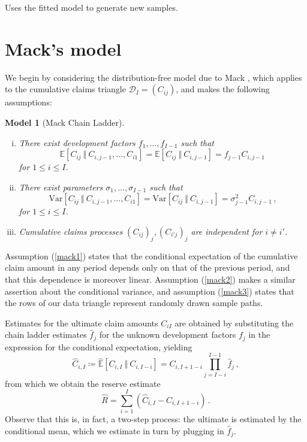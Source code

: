 \documentclass[a4paper]{book}
\theoremstyle{plain}
\newtheorem{model}{Model}
\begin{document}
Uses the fitted model to generate new samples.

\section{Mack's model}

We begin by considering the distribution-free model due to Mack , which applies to the cumulative claims triangle $\mathcal{D}_I = (C_{ij})$, and makes the following assumptions:

\begin{model}[Mack Chain Ladder] \label{mack} \leavevmode
    \begin{enumerate}[(i)]
        \item \label{mack1} There exist development factors $f_1, \dots, f_{I - 1}$ such that
        \begin{displaymath}
            \mathbb{E}[C_{ij} \ \Vert \ C_{i, j - 1}, \dots, C_{i1}] = \mathbb{E}[C_{ij} \ \Vert \ C_{i, j - 1}] = f_{j - 1} C_{i, j - 1}\,
        \end{displaymath}
        for $1 \leq i \leq I$.
        \item \label{mack2} There exist parameters $\sigma_1, \dots, \sigma_{I - 1}$ such that
        \begin{displaymath}
            \mathrm{Var}[C_{ij} \ \Vert \ C_{i, j - 1}, \dots, C_{i1}] = \mathrm{Var}[C_{ij} \ \Vert \ C_{i, j - 1}] = \sigma_{j - 1}^2 C_{i, j - 1}\,,
        \end{displaymath}
        for $1 \leq i \leq I$.
        \item \label{mack3} Cumulative claims processes $(C_{ij})_j, (C_{i'j})_j$ are independent for $i \neq i'$.
    \end{enumerate}
\end{model}

Assumption (\ref{mack1}) states that the conditional expectation of the cumulative claim amount in any period depends only on that of the previous period, and that this dependence is moreover linear. Assumption (\ref{mack2}) makes a similar assertion about the conditional variance, and assumption (\ref{mack3}) states that the rows of our data triangle represent randomly drawn sample paths.

Estimates for the ultimate claim amounts $C_{iI}$ are obtained by substituting the chain ladder estimates $\hat{f}_j$ for the unknown development factors $f_j$ in the expression for the conditional expectation, yielding
\begin{equation}
    \hat{C}_{i, I} \coloneqq \hat{\mathbb{E}}[C_{i, I} \ \Vert \ C_{i, I-i}] = C_{i, I + 1 - i} \prod_{j=I-i}^{I-1} \hat{f}_j  \,,
\end{equation}
from which we obtain the reserve estimate
\begin{equation}
    \hat{R} = \sum_{i = 1}^I (\hat{C}_{i, I} - C_{i, I + 1- i}) \,.
\end{equation}
Observe that this is, in fact, a two-step process: the ultimate is estimated by the conditional mean, which we estimate in turn by plugging in $\hat{f}_j$.
\end{document}
